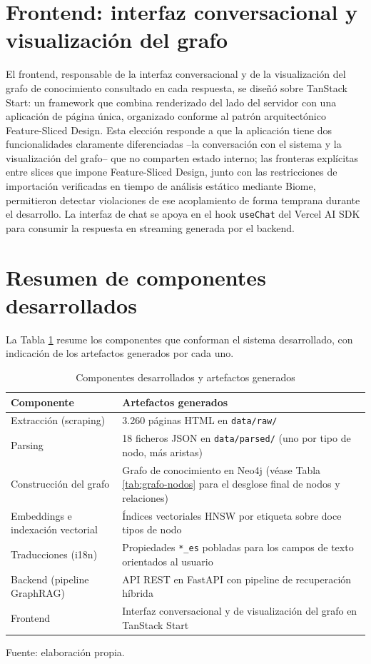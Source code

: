 \documentclass[11pt,a4paper,spanish]{book}
\numberwithin{equation}{chapter}
\numberwithin{figure}{chapter}
\numberwithin{table}{chapter}
\begin{document}
\section{Frontend: interfaz conversacional y visualización del grafo}
\label{sec:frontend}

El frontend, responsable de la interfaz conversacional y de la visualización del grafo de conocimiento consultado en cada respuesta, se diseñó sobre TanStack Start: un framework que combina renderizado del lado del servidor con una aplicación de página única, organizado conforme al patrón arquitectónico Feature-Sliced Design. Esta elección responde a que la aplicación tiene dos funcionalidades claramente diferenciadas --la conversación con el sistema y la visualización del grafo-- que no comparten estado interno; las fronteras explícitas entre slices que impone Feature-Sliced Design, junto con las restricciones de importación verificadas en tiempo de análisis estático mediante Biome, permitieron detectar violaciones de ese acoplamiento de forma temprana durante el desarrollo. La interfaz de chat se apoya en el hook \texttt{useChat} del Vercel AI SDK para consumir la respuesta en streaming generada por el backend.

\section{Resumen de componentes desarrollados}

La Tabla \ref{tab:estado-implementacion} resume los componentes que conforman el sistema desarrollado, con indicación de los artefactos generados por cada uno.

\begin{table}[h]
\centering
\begin{tabular}{|l|p{8.5cm}|}
	\hline
	\textbf{Componente} & \textbf{Artefactos generados} \\
	\hline
	Extracción (scraping) & 3.260 páginas HTML en \texttt{data/raw/} \\
	\hline
	Parsing & 18 ficheros JSON en \texttt{data/parsed/} (uno por tipo de nodo, más aristas) \\
	\hline
	Construcción del grafo & Grafo de conocimiento en Neo4j (véase Tabla \ref{tab:grafo-nodos} para el desglose final de nodos y relaciones) \\
	\hline
	Embeddings e indexación vectorial & Índices vectoriales HNSW por etiqueta sobre doce tipos de nodo \\
	\hline
	Traducciones (i18n) & Propiedades \texttt{*\_es} pobladas para los campos de texto orientados al usuario \\
	\hline
	Backend (pipeline GraphRAG) & API REST en FastAPI con pipeline de recuperación híbrida \\
	\hline
	Frontend & Interfaz conversacional y de visualización del grafo en TanStack Start \\
	\hline
\end{tabular}
\caption{Componentes desarrollados y artefactos generados}
\label{tab:estado-implementacion}
{\footnotesize\centering Fuente: elaboración propia.\par}
\end{table}
\end{document}
